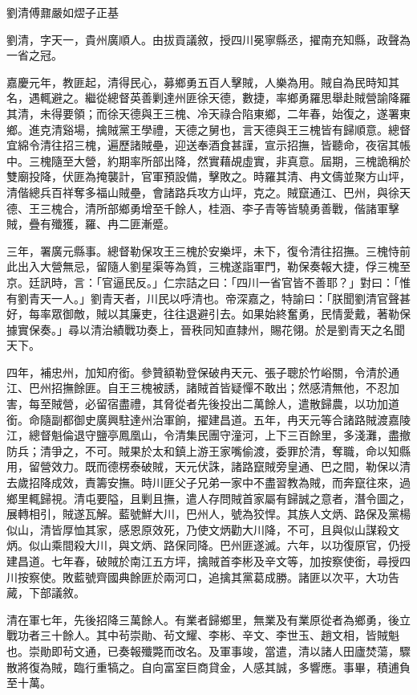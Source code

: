 
\begin{pinyinscope}
劉清傅鼐嚴如熤子正基

劉清，字天一，貴州廣順人。由拔貢議敘，授四川冕寧縣丞，擢南充知縣，政聲為一省之冠。

嘉慶元年，教匪起，清得民心，募鄉勇五百人擊賊，人樂為用。賊自為民時知其名，遇輒避之。繼從總督英善剿達州匪徐天德，數捷，率鄉勇羅思舉赴賊營諭降羅其清，未得要領；而徐天德與王三槐、冷天祿合陷東鄉，二年春，始復之，遂署東鄉。進克清谿場，擒賊黨王學禮，天德之舅也，言天德與王三槐皆有歸順意。總督宜綿令清往招三槐，遍歷諸賊壘，迎送奉酒食甚謹，宣示招撫，皆聽命，夜宿其帳中。三槐隨至大營，約期率所部出降，然實藉覘虛實，非真意。屆期，三槐詭稱於雙廟投降，伏匪為掩襲計，官軍預設備，擊敗之。時羅其清、冉文儔並聚方山坪，清偕總兵百祥奪多福山賊壘，會諸路兵攻方山坪，克之。賊竄通江、巴州，與徐天德、王三槐合，清所部鄉勇增至千餘人，桂涵、李子青等皆驍勇善戰，偕諸軍擊賊，疊有殲獲，羅、冉二匪漸蹙。

三年，署廣元縣事。總督勒保攻王三槐於安樂坪，未下，復令清往招撫。三槐恃前此出入大營無忌，留隨人劉星渠等為質，三槐遂詣軍門，勒保奏報大捷，俘三槐至京。廷訊時，言：「官逼民反。」仁宗詰之曰：「四川一省官皆不善耶？」對曰：「惟有劉青天一人。」劉青天者，川民以呼清也。帝深嘉之，特諭曰：「朕聞劉清官聲甚好，每率眾御敵，賊以其廉吏，往往退避引去。如果始終奮勇，民情愛戴，著勒保據實保奏。」尋以清治績戰功奏上，晉秩同知直隸州，賜花翎。於是劉青天之名聞天下。

四年，補忠州，加知府銜。參贊額勒登保破冉天元、張子聰於竹峪關，令清於通江、巴州招撫餘匪。自王三槐被誘，諸賊首皆疑憚不敢出；然感清無他，不忍加害，每至賊營，必留宿盡禮，其脅從者先後投出二萬餘人，遣散歸農，以功加道銜。命隨副都御史廣興駐達州治軍餉，擢建昌道。五年，冉天元等合諸路賊渡嘉陵江，總督魁倫退守鹽亭鳳凰山，令清集民團守潼河，上下三百餘里，多淺灘，盡撤防兵；清爭之，不可。賊果於太和鎮上游王家嘴偷渡，委罪於清，奪職，命以知縣用，留營效力。既而德楞泰破賊，天元伏誅，諸路竄賊旁皇通、巴之間，勒保以清去歲招降成效，責籌安撫。時川匪父子兄弟一家中不盡習教為賊，而奔竄往來，過鄉里輒歸視。清屯要隘，且剿且撫，遣人存問賊首家屬有歸誠之意者，潛令圖之，展轉相引，賊遂瓦解。藍號鮮大川，巴州人，號為狡悍。其族人文炳、路保及黨楊似山，清皆厚恤其家，感恩原效死，乃使文炳勸大川降，不可，且與似山謀殺文炳。似山乘間殺大川，與文炳、路保同降。巴州匪遂滅。六年，以功復原官，仍授建昌道。七年春，破賊於南江五方坪，擒賊首李彬及辛文等，加按察使銜，尋授四川按察使。敗藍號齊國典餘匪於兩河口，追擒其黨葛成勝。諸匪以次平，大功告蕆，下部議敘。

清在軍七年，先後招降三萬餘人。有業者歸鄉里，無業及有業原從者為鄉勇，後立戰功者三十餘人。其中茍崇勛、茍文耀、李彬、辛文、李世玉、趙文相，皆賊魁也。崇勛即茍文通，已奏報殲斃而改名。及軍事竣，當遣，清以諸人田廬焚蕩，驟散將復為賊，臨行重犒之。自向富室巨商貸金，人感其誠，多響應。事畢，積逋負至十萬。


\end{pinyinscope}
